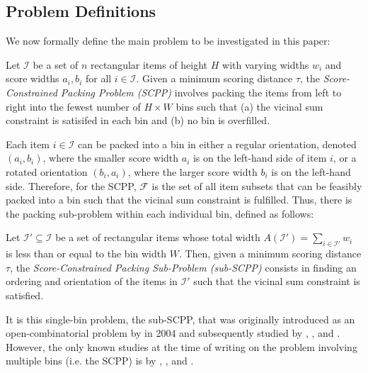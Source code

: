 \documentclass[a4paper,11pt,authoryear]{elsarticle}
\begin{document}
\subsection{Problem Definitions}
\label{sub:intro}

\noindent We now formally define the main problem to be investigated in this paper:

\begin{definition}
	Let $\mathcal{I}$ be a set of $n$ rectangular items of height $H$ with varying widths $w_i$ and score widths $a_i, b_i$ for all $i \in \mathcal{I}$. Given a minimum scoring distance $\tau$, the \emph{Score-Constrained Packing Problem (SCPP)} involves packing the items from left to right into the fewest number of $H \times W$ bins such that (a) the vicinal sum constraint is satisifed in each bin and (b) no bin is overfilled.
	\label{defn:scpp}
\end{definition}	

\noindent Each item $i \in \mathcal{I}$ can be packed into a bin in either a regular orientation, denoted $(a_i, b_i)$, where the smaller score width $a_i$ is on the left-hand side of item $i$, or a rotated orientation $(b_i, a_i)$, where the larger score width $b_i$ is on the left-hand side. Therefore, for the SCPP, $\mathcal{F}$ is the set of all item subsets that can be feasibly packed into a bin such that the vicinal sum constraint is fulfilled. Thus, there is the packing sub-problem within each individual bin, defined as follows:

\begin{definition}
	Let $\mathcal{I}' \subseteq \mathcal{I}$ be a set of rectangular items whose total width $A(\mathcal{I}') = \sum_{i \in \mathcal{I}'} w_i$ is less than or equal to the bin width $W$. Then, given a minimum scoring distance $\tau$, the \emph{Score-Constrained Packing Sub-Problem (sub-SCPP)} consists in finding an ordering and orientation of the items in $\mathcal{I}'$ such that the vicinal sum constraint is satisfied.
	\label{defn:subscp}
\end{definition}

\noindent It is this single-bin problem, the sub-SCPP, that was originally introduced as an open-combinatorial problem by \citeauthor{goulimis2004} in 2004 and subsequently studied by \cite{becker2010}, \cite{lewis2011}, and \cite{becker2015}. However, the only known studies at the time of writing on the problem involving multiple bins (i.e. the SCPP) is by \citet{lewis2011}, \cite{hawa2018}, and \citet{hawa2020t}.
\end{document}
